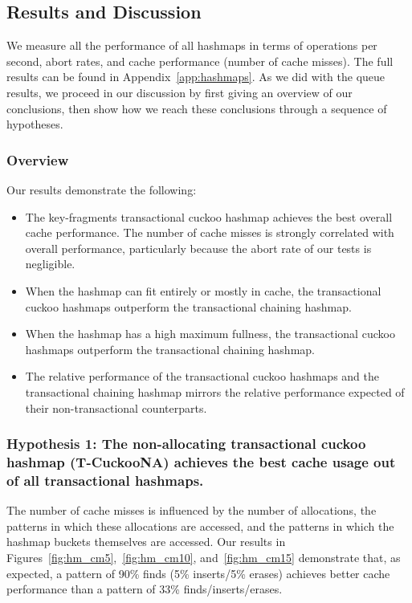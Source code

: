 \subsection{Results and Discussion}

We measure all the performance of all hashmaps in terms of operations per second, abort rates, and cache performance (number of cache misses). 
The full results can be found in Appendix~\ref{app:hashmaps}. As we did with the queue results, we proceed in our discussion by first giving an overview of our conclusions, then show how we reach these conclusions through a sequence of hypotheses.

\subsubsection{Overview}
Our results demonstrate the following:
\begin{itemize}
    \item The key-fragments transactional cuckoo hashmap achieves the best overall cache performance. The number of cache misses is strongly correlated with overall performance, particularly because the abort rate of our tests is negligible.
    \item When the hashmap can fit entirely or mostly in cache, the transactional cuckoo hashmaps outperform the transactional chaining hashmap.
    \item When the hashmap has a high maximum fullness, the transactional cuckoo hashmaps outperform the transactional chaining hashmap.
    \item The relative performance of the transactional cuckoo hashmaps and the transactional chaining hashmap mirrors the relative performance expected of their non-transactional counterparts.
\end{itemize}

\subsubsection{Hypothesis 1: The non-allocating transactional cuckoo hashmap (T-CuckooNA) achieves the best cache usage out of all transactional hashmaps.}
\label{section:hmcm}

The number of cache misses is influenced by the number of allocations, the patterns in which these allocations are accessed, and the patterns in which the hashmap buckets themselves are accessed. Our results in Figures~\ref{fig:hm_cm5},~\ref{fig:hm_cm10}, and~\ref{fig:hm_cm15} demonstrate that, as expected, a pattern of 90\% finds (5\% inserts/5\% erases) achieves better cache performance than a pattern of 33\% finds/inserts/erases.

